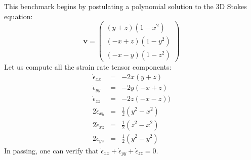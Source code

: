 This benchmark begins by postulating a polynomial solution to the 3D Stokes equation:
\begin{equation}
{\bm v}
=
\left(
\begin{array}{c}
(y+z)(1-x^2) \\
(-x+z)(1-y^2) \\
(-x-y)(1-z^2) 
\end{array}
\right)
\label{eqgarf}
\end{equation}
Let us compute all the strain rate tensor components:
\begin{eqnarray}
\dot{\epsilon}_{xx}&=& -2x(y+z)  \nonumber\\
\dot{\epsilon}_{yy}&=& -2y(-x+z) \nonumber\\
\dot{\epsilon}_{zz}&=& -2z(-x-z)) \nonumber\\
2 \dot{\epsilon}_{xy}&=& \frac{1}{2}(y^2-x^2) \nonumber\\ 
2 \dot{\epsilon}_{xz}&=& \frac{1}{2}(z^2-x^2)  \nonumber\\
2 \dot{\epsilon}_{yz}&=& \frac{1}{2}(y^2-y^2)  \nonumber
\end{eqnarray}
In passing, one can verify that 
$
\dot{\epsilon}_{xx}
+\dot{\epsilon}_{yy}
+\dot{\epsilon}_{zz}=0
$.







